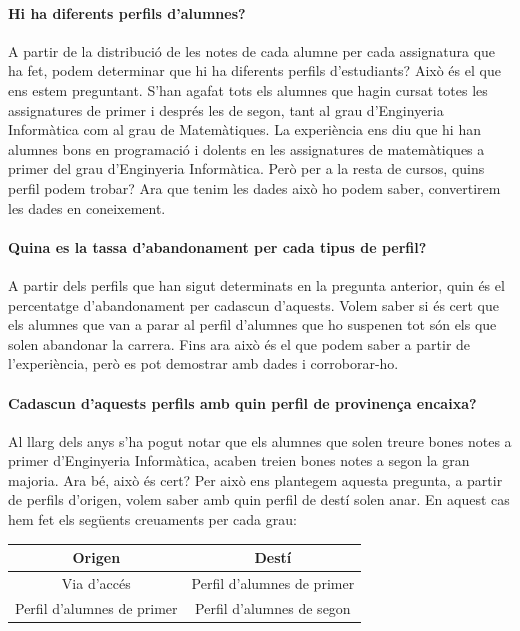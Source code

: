 \documentclass[12pt,a4paper,catalan]{article}
\begin{document}
\paragraph{Hi ha diferents perfils d'alumnes?}
A partir de la distribució de les notes de cada alumne per cada assignatura que ha fet, podem determinar que hi ha diferents perfils d'estudiants? Això és el que ens estem preguntant. S'han agafat tots els alumnes que hagin cursat totes les assignatures de primer i després les de segon, tant al grau d'Enginyeria Informàtica com al grau de Matemàtiques. La experiència ens diu que hi han alumnes bons en programació i dolents en les assignatures de matemàtiques a primer del grau d'Enginyeria Informàtica. Però per a la resta de cursos, quins perfil podem trobar? Ara que tenim les dades això ho podem saber, convertirem les dades en coneixement.

\paragraph{Quina es la tassa d'abandonament per cada tipus de perfil?}
A partir dels perfils que han sigut determinats en la pregunta anterior, quin és el percentatge d'abandonament per cadascun d'aquests. Volem saber si és cert que els alumnes que van a parar al perfil d'alumnes que ho suspenen tot són els que solen abandonar la carrera. Fins ara això és el que podem saber a partir de l'experiència, però es pot demostrar amb dades i corroborar-ho.

\paragraph{Cadascun d'aquests perfils amb quin perfil de provinença encaixa?}
Al llarg dels anys s'ha pogut notar que els alumnes que solen treure bones notes a primer d'Enginyeria Informàtica, acaben treien bones notes a segon la gran majoria. Ara bé, això és cert? Per això ens plantegem aquesta pregunta, a partir de perfils d'origen, volem saber amb quin perfil de destí solen anar. En aquest cas hem fet els següents creuaments per cada grau:

\begin{table}[h]
\centering
\begin{tabular}{@{}cc@{}}
\toprule
{\bf Origen}               & {\bf Destí}                \\ \midrule
Via d'accés                & Perfil d'alumnes de primer \\
Perfil d'alumnes de primer & Perfil d'alumnes de segon  \\ \bottomrule
\end{tabular}
\end{table}
\end{document}
